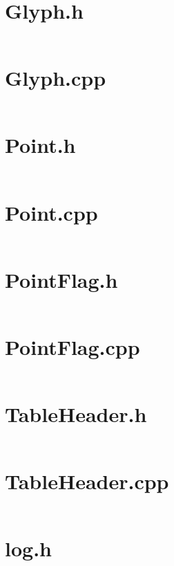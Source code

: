 \documentclass{report}
\begin{document}
\section{Glyph.h}
\inputminted[linenos, frame=lines, framesep=2mm, breaklines,
tabsize=4]{cpp}{/home/jake/TTFParser/include/Glyph.h}

\section{Glyph.cpp}
\inputminted[linenos, frame=lines, framesep=2mm, breaklines,
tabsize=4]{cpp}{/home/jake/TTFParser/src/Glyph.cpp}

\section{Point.h}
\inputminted[linenos, frame=lines, framesep=2mm, breaklines,
tabsize=4]{cpp}{/home/jake/TTFParser/include/Point.h}

\section{Point.cpp}
\inputminted[linenos, frame=lines, framesep=2mm, breaklines,
tabsize=4]{cpp}{/home/jake/TTFParser/src/Point.cpp}

\section{PointFlag.h}
\inputminted[linenos, frame=lines, framesep=2mm, breaklines,
tabsize=4]{cpp}{/home/jake/TTFParser/include/PointFlag.h}
\section{PointFlag.cpp}
\inputminted[linenos, frame=lines, framesep=2mm, breaklines,
tabsize=4]{cpp}{/home/jake/TTFParser/src/PointFlag.cpp}
\section{TableHeader.h}
  \inputminted[linenos, frame=lines, framesep=2mm, breaklines,
  tabsize=4]{cpp}{/home/jake/TTFParser/include/TableHeader.h}
\section{TableHeader.cpp}
\inputminted[linenos, frame=lines, framesep=2mm, breaklines,
tabsize=4]{cpp}{/home/jake/TTFParser/src/TableHeader.cpp}

\section{log.h}
\inputminted[linenos, frame=lines, framesep=2mm, breaklines,
tabsize=4]{cpp}{/home/jake/TTFParser/include/log.h}
\end{document}
